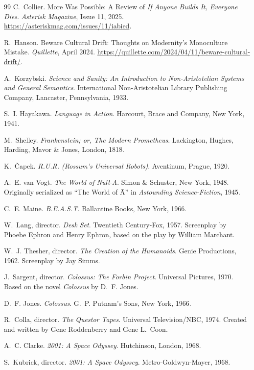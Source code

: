 \documentclass[11pt]{article}
\begin{document}
\begin{thebibliography}{99}
C.~Collier.
\newblock More Was Possible: A Review of
\emph{If Anyone Builds It, Everyone Dies}.
\newblock \emph{Asterisk Magazine}, Issue 11, 2025.
\newblock \url{https://asteriskmag.com/issues/11/iabied}.

R.~Hanson.
\newblock Beware Cultural Drift: Thoughts on Modernity's Monoculture Mistake.
\newblock \emph{Quillette}, April 2024.
\newblock \url{https://quillette.com/2024/04/11/beware-cultural-drift/}.

A.~Korzybski.
\newblock \emph{Science and Sanity: An Introduction to Non-Aristotelian
Systems and General Semantics}.
\newblock International Non-Aristotelian Library Publishing Company,
Lancaster, Pennsylvania, 1933.

S.~I. Hayakawa.
\newblock \emph{Language in Action}.
\newblock Harcourt, Brace and Company, New York, 1941.

M.~Shelley.
\newblock \emph{Frankenstein; or, The Modern Prometheus}.
\newblock Lackington, Hughes, Harding, Mavor \& Jones, London, 1818.

K.~Čapek.
\newblock \emph{R.U.R. (Rossum's Universal Robots)}.
\newblock Aventinum, Prague, 1920.

A.~E. van Vogt.
\newblock \emph{The World of Null-A}.
\newblock Simon \& Schuster, New York, 1948.
\newblock Originally serialized as ``The World of \={A}'' in
\emph{Astounding Science-Fiction}, 1945.

C.~E. Maine.
\newblock \emph{B.E.A.S.T.}
\newblock Ballantine Books, New York, 1966.

W.~Lang, director.
\newblock \emph{Desk Set}.
\newblock Twentieth Century-Fox, 1957.
\newblock Screenplay by Phoebe Ephron and Henry Ephron, based on the play
by William Marchant.

W.~J. Thesher, director.
\newblock \emph{The Creation of the Humanoids}.
\newblock Genie Productions, 1962.
\newblock Screenplay by Jay Simms.

J.~Sargent, director.
\newblock \emph{Colossus: The Forbin Project}.
\newblock Universal Pictures, 1970.
\newblock Based on the novel \emph{Colossus} by D.~F. Jones.

D.~F. Jones.
\newblock \emph{Colossus}.
\newblock G.~P. Putnam's Sons, New York, 1966.

R.~Colla, director.
\newblock \emph{The Questor Tapes}.
\newblock Universal Television/NBC, 1974.
\newblock Created and written by Gene Roddenberry and Gene L.~Coon.

A.~C. Clarke.
\newblock \emph{2001: A Space Odyssey}.
\newblock Hutchinson, London, 1968.

S.~Kubrick, director.
\newblock \emph{2001: A Space Odyssey}.
\newblock Metro-Goldwyn-Mayer, 1968.

\end{thebibliography}
\end{document}
